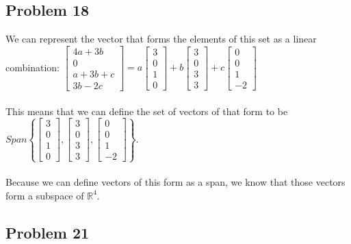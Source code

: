 \documentclass{article}%
\begin{document}
\subsection*{Problem 18}
We can represent the vector that forms the elements of this set as a linear combination:
$
\begin{bmatrix}
    4a + 3b \\
    0 \\
    a + 3b + c \\
    3b - 2c
\end{bmatrix}
=
a
\begin{bmatrix}
    3 \\ 0 \\ 1 \\ 0
\end{bmatrix}
+
b
\begin{bmatrix}
    3 \\ 0 \\ 3 \\ 3
\end{bmatrix}
+
c
\begin{bmatrix}
    0 \\ 0 \\ 1 \\ -2
\end{bmatrix}$\\
\\
This means that we can define the set of vectors of that form to be
$
Span
\left\{
    \begin{bmatrix}
        3 \\ 0 \\ 1 \\ 0
    \end{bmatrix}
    ,
    \begin{bmatrix}
        3 \\ 0 \\ 3 \\ 3
    \end{bmatrix}
    ,
    \begin{bmatrix}
        0 \\ 0 \\ 1 \\ -2
    \end{bmatrix}
\right\}
$.\\
\\
Because we can define vectors of this form as a span, we know that those vectors form a subspace of $\mathbb{R}^4$.

\subsection*{Problem 21}
\end{document}
